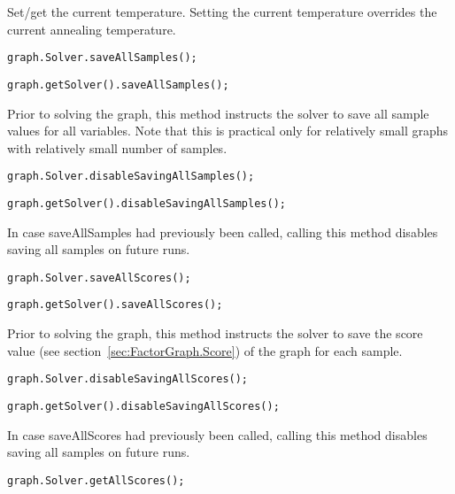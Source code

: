 Set/get the current temperature. Setting the current temperature overrides the current annealing temperature.

\ifmatlab
\begin{lstlisting}
graph.Solver.saveAllSamples();
\end{lstlisting}
\fi

\ifjava
\begin{lstlisting}
graph.getSolver().saveAllSamples();
\end{lstlisting}
\fi

Prior to solving the graph, this method instructs the solver to save all sample values for all variables. Note that this is practical only for relatively small graphs with relatively small number of samples.

\ifmatlab
\begin{lstlisting}
graph.Solver.disableSavingAllSamples();
\end{lstlisting}
\fi

\ifjava
\begin{lstlisting}
graph.getSolver().disableSavingAllSamples();
\end{lstlisting}
\fi

In case saveAllSamples had previously been called, calling this method disables saving all samples on future runs.

\ifmatlab
\begin{lstlisting}
graph.Solver.saveAllScores();
\end{lstlisting}
\fi

\ifjava
\begin{lstlisting}
graph.getSolver().saveAllScores();
\end{lstlisting}
\fi

Prior to solving the graph, this method instructs the solver to save the score value (see section~\ref{sec:FactorGraph.Score}) of the graph for each sample.

\ifmatlab
\begin{lstlisting}
graph.Solver.disableSavingAllScores();
\end{lstlisting}
\fi

\ifjava
\begin{lstlisting}
graph.getSolver().disableSavingAllScores();
\end{lstlisting}
\fi

In case saveAllScores had previously been called, calling this method disables saving all samples on future runs.

\ifmatlab
\begin{lstlisting}
graph.Solver.getAllScores();
\end{lstlisting}
\fi


